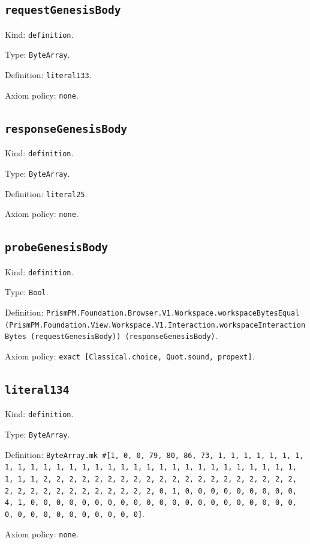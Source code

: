 \documentclass[11pt]{article}
\begin{document}
\subsection*{\texttt{requestGenesisBody}}
\noindent Kind: \texttt{definition}.\par
\noindent Type: \texttt{ByteArray}.\par
\noindent Definition: \texttt{literal133}.\par
\noindent Axiom policy: \texttt{none}.\par
\subsection*{\texttt{responseGenesisBody}}
\noindent Kind: \texttt{definition}.\par
\noindent Type: \texttt{ByteArray}.\par
\noindent Definition: \texttt{literal25}.\par
\noindent Axiom policy: \texttt{none}.\par
\subsection*{\texttt{probeGenesisBody}}
\noindent Kind: \texttt{definition}.\par
\noindent Type: \texttt{Bool}.\par
\noindent Definition: \texttt{PrismPM.Foundation.Browser.V1.Workspace.workspaceBytesEqual (PrismPM.Foundation.View.Workspace.V1.Interaction.workspaceInteractionBytes (requestGenesisBody)) (responseGenesisBody)}.\par
\noindent Axiom policy: \texttt{exact [Classical.choice, Quot.sound, propext]}.\par
\subsection*{\texttt{literal134}}
\noindent Kind: \texttt{definition}.\par
\noindent Type: \texttt{ByteArray}.\par
\noindent Definition: \texttt{ByteArray.mk \#[1, 0, 0, 79, 80, 86, 73, 1, 1, 1, 1, 1, 1, 1, 1, 1, 1, 1, 1, 1, 1, 1, 1, 1, 1, 1, 1, 1, 1, 1, 1, 1, 1, 1, 1, 1, 1, 1, 1, 1, 2, 2, 2, 2, 2, 2, 2, 2, 2, 2, 2, 2, 2, 2, 2, 2, 2, 2, 2, 2, 2, 2, 2, 2, 2, 2, 2, 2, 2, 2, 2, 2, 0, 1, 0, 0, 0, 0, 0, 0, 0, 0, 0, 4, 1, 0, 0, 0, 0, 0, 0, 0, 0, 0, 0, 0, 0, 0, 0, 0, 0, 0, 0, 0, 0, 0, 0, 0, 0, 0, 0, 0, 0, 0, 0, 0, 0]}.\par
\noindent Axiom policy: \texttt{none}.\par
\end{document}
